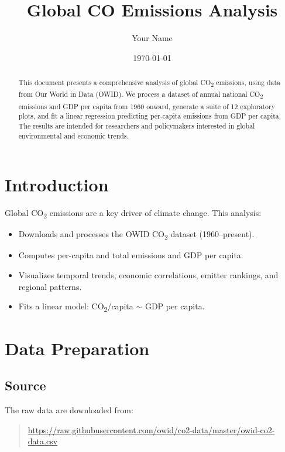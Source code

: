 \documentclass[11pt,a4paper]{article}
\title{Global CO\boldmath{$_2$} Emissions Analysis}
\author{Your Name}
\date{\today}
\begin{document}
\maketitle

\begin{abstract}
This document presents a comprehensive analysis of global CO\textsubscript{2} emissions,
using data from Our World in Data (OWID). We process a dataset of annual national
CO\textsubscript{2} emissions and GDP per capita from 1960 onward, generate a suite of 12
exploratory plots, and fit a linear regression predicting per-capita emissions from
GDP per capita. The results are intended for researchers and policymakers interested
in global environmental and economic trends.
\end{abstract}

\tableofcontents
\newpage

\section{Introduction}
Global CO\textsubscript{2} emissions are a key driver of climate change. This analysis:
\begin{itemize}
  \item Downloads and processes the OWID CO\textsubscript{2} dataset (1960--present).
  \item Computes per-capita and total emissions and GDP per capita.
  \item Visualizes temporal trends, economic correlations, emitter rankings, and regional patterns.
  \item Fits a linear model: CO\textsubscript{2}/capita \(\sim\) GDP per capita.
\end{itemize}

\section{Data Preparation}
\subsection{Source}
The raw data are downloaded from:
\begin{quote}
\url{https://raw.githubusercontent.com/owid/co2-data/master/owid-co2-data.csv}
\end{quote}
\end{document}
